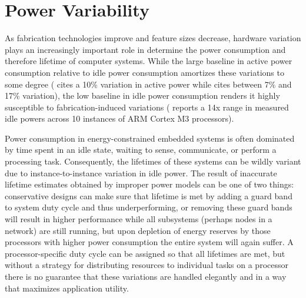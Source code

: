 \section{Power Variability}

As fabrication technologies improve and feature sizes decrease, hardware variation plays an increasingly important role in determine the power consumption and therefore lifetime of computer systems.  While the large baseline in active power consumption relative to idle power consumption amortizes these variations to some degree (\cite{wanner2011} cites a 10\% variation in active power while \cite{balaji2012} cites between 7\% and 17\% variation), the low baseline in idle power consumption renders it highly susceptible to fabrication-induced variations (\cite{wanner2011} reports a 14x range in measured idle powers across 10 instances of ARM Cortex M3 processors). 

Power consumption in energy-constrained embedded systems is often dominated by time spent in an idle state, waiting to sense, communicate, or perform a processing task. Consequently, the lifetimes of these systems can be wildly variant due to instance-to-instance variation in idle power.  The result of inaccurate lifetime estimates obtained by improper power models can be one of two things: conservative designs can make sure that lifetime is met by adding a guard band to system duty cycle and thus underperforming, or removing these guard bands will result in higher performance while all subsystems (perhaps nodes in a network) are still running, but upon depletion of energy reserves by those processors with higher power consumption the entire system will again suffer.  A processor-specific duty cycle can be assigned so that all lifetimes are met, but without a strategy for distributing resources to individual tasks on a processor there is no guarantee that these variations are handled elegantly and in a way that maximizes application utility.